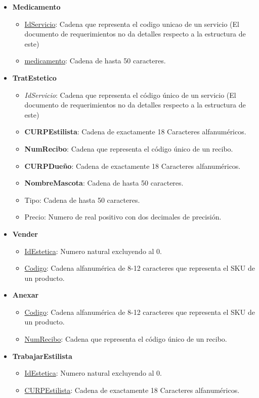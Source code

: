 \documentclass{exam}
\begin{document}
\begin{itemize}
	\item \textbf{Medicamento}
		\begin{itemize}
			\item \underline{IdServicio}: Cadena que representa el codigo unicao de un servicio (El documento de requerimientos no da detalles respecto a la estructura de este)
			\item \underline{medicamento}: Cadena de hasta 50 caracteres.
		\end{itemize}
		
	\item \textbf{TratEstetico}
		\begin{itemize}
			\item \textit{IdServicio}: Cadena que representa el código único de un servicio (El documento de requerimientos no da detalles respecto a la estructura de este)
			\item \textbf{CURPEstilista}: Cadena de exactamente 18 Caracteres alfanuméricos.
			\item \textbf{NumRecibo}: Cadena que representa el código único de un recibo.
			\item \textbf{CURPDueño}: Cadena de exactamente 18 Caracteres alfanuméricos.
			\item \textbf{NombreMascota}: Cadena de hasta 50 caracteres.
			\item Tipo: Cadena de hasta 50 caracteres.
			\item Precio: Numero de real positivo con dos decimales de precisión.
		\end{itemize}
		
	\item \textbf{Vender}
		\begin{itemize}
			\item \underline{IdEstetica}: Numero natural excluyendo al 0.
			\item \underline{Codigo}: Cadena alfanumérica de 8-12 caracteres que representa el SKU de un producto.
		\end{itemize}			
	
	\item \textbf{Anexar}
		\begin{itemize}
			\item \underline{Codigo}: Cadena alfanumérica de 8-12 caracteres que representa el SKU de un producto.
			\item \underline{NumRecibo}: Cadena que representa el código único de un recibo.
		\end{itemize}
		
	\item \textbf{TrabajarEstilista}
		\begin{itemize}
			\item \underline{IdEstetica}: Numero natural excluyendo al 0.
			\item \underline{CURPEstilista}: Cadena de exactamente 18 Caracteres alfanuméricos.
		\end{itemize}
		

\end{itemize}
\end{document}
